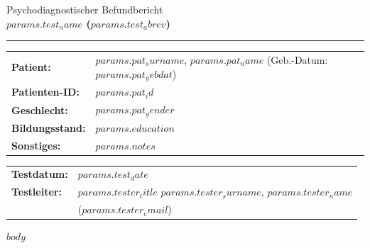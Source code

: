 \documentclass{article}
\newcommand{\rightmarginwidth}{50mm}
\newcommand{\leftmarginwidth}{10mm}
\newcommand{\footerdistance}{15mm} %
\newlength{\extendedrightmargin}
\begin{document}
\newcommand{\textblockwidth}{\dimexpr\textwidth\relax}
\setlength{\parindent}{0pt}
\setlength{\parskip}{0pt}

  \begin{minipage}{\textblockwidth}


  {\fontsize{12}{14}\selectfont
  \begin{flushleft}
    {\large Psychodiagnostischer Befundbericht} \\[2mm]
    {\LARGE\textbf{$params.test_name$ ($params.test_abrev$)}} \\[2mm]
    \rule{\textwidth}{0.4pt}
  \end{flushleft}\vspace{-0.5mm}
\begin{flushleft}
{\small
\begin{tabular}{@{}p{35mm}l@{}} %
\textbf{Patient:} & $params.pat_surname$, $params.pat_name$ (Geb.-Datum: $params.pat_gebdat$) \\[2mm]
\textbf{Patienten-ID:} & $params.pat_id$ \\[2mm]
\textbf{Geschlecht:} & $params.pat_gender$ \\ [2mm]
\textbf{Bildungsstand:} & $params.education$ \\[2mm]
\textbf{Sonstiges:} & $params.notes$ \\[4mm]
\end{tabular}

\vspace{5mm} %

\begin{tabular}{@{}p{35mm}l@{}} %
\textbf{Testdatum:} & $params.test_date$ \\[2mm]
\textbf{Testleiter:} & $params.tester_title$ $params.tester_surname$, $params.tester_name$ \\
                     & ($params.tester_email$)
\end{tabular}
}
\end{flushleft} }
\end{minipage}
  
$body$



\end{document}
